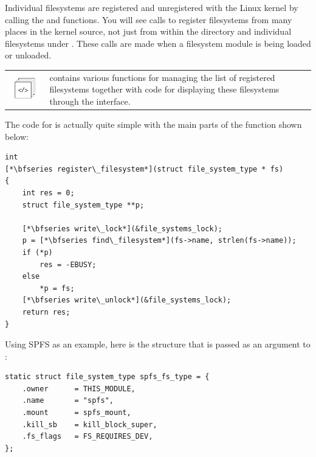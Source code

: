 Individual filesystems are registered and unregistered with the Linux kernel by calling the  and  functions. You will see calls to register filesystems from many places in the kernel source, not just from within the  directory and individual filesystems under . These calls are made when a filesystem module is being loaded or unloaded.

\begin{table}[h]
\begin{tabular}{ll}
\parbox[l]{0.6in}{\includegraphics[scale=0.8]{figures/src-xref.pdf}} & \parbox[l]{4in}{\small{ contains various functions for managing the list of registered filesystems together with code for displaying these filesystems through the  interface.}}
\end{tabular}
\end{table}

\noindent
The code for  is actually quite simple with the main parts of the function shown below:

\begin{lstlisting}
int
[*\bfseries register\_filesystem*](struct file_system_type * fs)
{
    int res = 0;
    struct file_system_type **p;

    [*\bfseries write\_lock*](&file_systems_lock);
    p = [*\bfseries find\_filesystem*](fs->name, strlen(fs->name));
    if (*p)
        res = -EBUSY;
    else
        *p = fs;
    [*\bfseries write\_unlock*](&file_systems_lock);
    return res;
}
\end{lstlisting}

\noindent
Using SPFS as an example, here is the  structure that is passed as an argument to :

\begin{lstlisting}
static struct file_system_type spfs_fs_type = {
    .owner      = THIS_MODULE,
    .name       = "spfs",
    .mount      = spfs_mount,
    .kill_sb    = kill_block_super,
    .fs_flags   = FS_REQUIRES_DEV,
};
\end{lstlisting}

